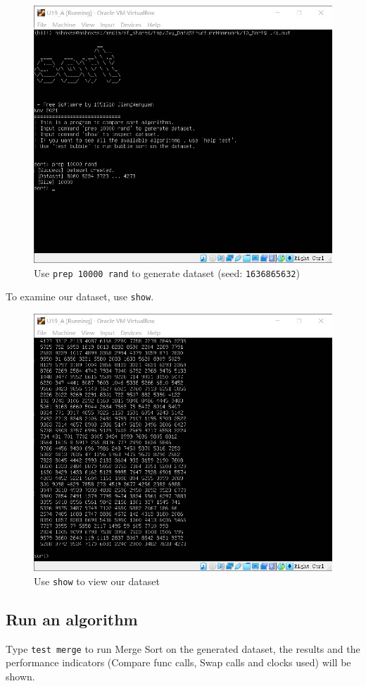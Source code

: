 \documentclass[cn,black,12pt,normal]{elegantnote}
\begin{document}
\begin{figure}[H]
    \centering
    \includegraphics[width=0.7\linewidth]{image/sort_02.jpg}
    \caption{Use \lstinline{prep 10000 rand} to generate dataset (seed: \lstinline{1636865632})}
\end{figure}

To examine our dataset, use \lstinline{show}.

\begin{figure}[H]
    \centering
    \includegraphics[width=0.7\linewidth]{image/sort_03.jpg}
    \caption{Use \lstinline{show} to view our dataset}
\end{figure}

\subsection{Run an algorithm}

Type \lstinline{test merge} to run Merge Sort on the generated dataset, the results and the performance indicators (Compare func calls, Swap calls and clocks used) will be shown.
\end{document}
